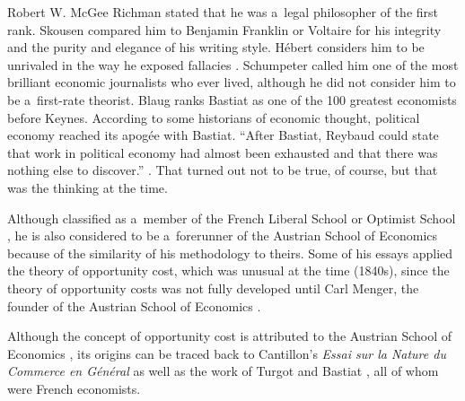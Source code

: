 \begin{artengenv}{Robert W. McGee}
Richman 
\parencite*[][p.ix]{bastiat_foreward_1998} %
 stated that he was a~legal philosopher of the first rank. Skousen 
\parencite*[][p.59]{skousen_making_2001} %
 compared him to Benjamin Franklin or Voltaire for his integrity and the purity and elegance of his writing style. Hébert 
\parencite*[][p.205]{hebert_bastiat_2016} %
 considers him to be unrivaled in the way he exposed fallacies 
\parencite[][p.59]{skousen_making_2001}. %
 Schumpeter 
\parencite*[][p.500]{schumpeter_history_1954} %
 called him one of the most brilliant economic journalists who ever lived, although he did not consider him to be a~first-rate theorist. Blaug 
\parencite*[][]{blaug_great_1986} %
 ranks Bastiat as one of the 100 greatest economists before Keynes. According to some historians of economic thought, political economy reached its apogée with Bastiat. ``After Bastiat, Reybaud could state that work in political economy had almost been exhausted and that there was nothing else to discover.'' 
\parencite[][p.2]{screpanti_outline_1993}. %
 That turned out not to be true, of course, but that was the thinking at the time.



Although classified as a~member of the French Liberal School or Optimist School 
\parencites[][pp.376–382]{cossa_introduction_1893}[][pp.329–354]{gide_history_1948}, %
 he is also considered to be a~forerunner of the Austrian School of Economics 
\parencite[][]{holcombe_frederic_1999} %
 because of the similarity of his methodology to theirs. Some of his essays applied the theory of opportunity cost, which was unusual at the time (1840s), since the theory of opportunity costs was not fully developed until Carl Menger, the founder of the Austrian School of Economics 
\parencite[][]{menger_grundsatze_1871}.%




Although the concept of opportunity cost is attributed to the Austrian School of Economics 
\parencites[][p.14]{buchanan1973introduction}[][p.895]{haney_history_1949}[][p.917]{schumpeter_history_1954}, %
 its origins can be traced back to Cantillon's \textit{Essai sur la Nature du Commerce en Général} 
\parencite*[][]{cantillon_essai_1755} %
 as well as the work of Turgot 
\parencites[][p.391]{rothbard_economic_1995}[][pp.34, 40]{holcombe_rj_1999} %
 and Bastiat 
\parencite[][pp.62–63]{holcombe_frederic_1999}, %
 all of whom were French economists.




\end{artengenv}
